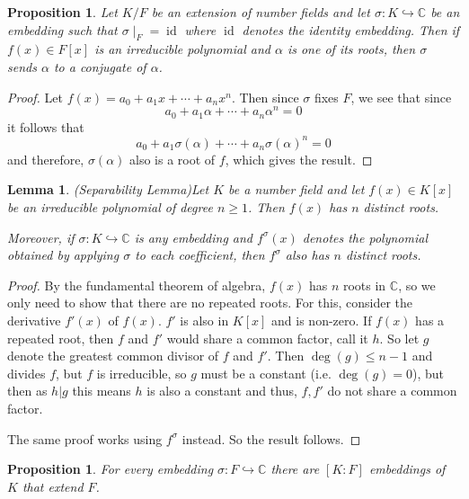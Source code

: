 \documentclass[11pt,a4paper]{report}
\theoremstyle{plain}
\newtheorem{lem}[subsection]{Lemma}
\newtheorem{prop}[subsection]{Proposition}
\theoremstyle{definition}
\theoremstyle{definition}
\def\CC{\mathbb{C}}
\def \a{\alpha}
\def \s {\sigma}
\def \s {\sigma}
\newcommand{\id}{\operatorname{id}}
\begin{document}
	
	\begin{prop}\label{prop: conj roots emb}
		Let $K/F$ be an extension of number fields and let $\sigma: K \hookrightarrow \CC$ be an embedding such that $\sigma\mid_F=\id$ where $\id$ denotes the identity embedding. Then if $f(x) \in F[x]$ is an irreducible polynomial and $\a$ is one of its roots, then $\sigma$ sends $\a$ to a conjugate of $\a$.
	\end{prop}
	
	\begin{proof}
		Let $f(x)= a_0+a_1x+\cdots+a_nx^n$. Then since $\sigma$ fixes $F$, we see that since \[a_0+a_1\a+\cdots+a_n\a^n=0\] it follows that  \[a_0+a_1\sigma(\a)+\cdots+a_n\sigma(\a)^n=0\] and therefore, $\sigma(\a)$ also is a root of $f$, which gives the result.
	\end{proof}
	
	\begin{lem}(Separability Lemma)\label{lem: sep lem} Let $K$ be a number field and let $f(x) \in K[x]$ be an irreducible polynomial of degree $n \geq 1$. Then $f(x)$ has $n$ distinct roots.
		
		Moreover, if $\s:K \hookrightarrow \CC$ is any embedding and $f^\s(x)$ denotes the polynomial obtained by applying $\s$ to each coefficient, then $f^\s$ also has $n$ distinct roots.
		
		
		
	\end{lem}
	\begin{proof}
		By the fundamental theorem of algebra, $f(x)$ has $n$ roots in $\CC$, so we only need to show that there are no repeated roots. For this, consider the derivative $f'(x)$ of $f(x)$. $f'$ is also in $K[x]$ and is non-zero. If $f(x)$ has a repeated root, then $f$ and $f'$ would share a common factor, call it $h$. So let $g$ denote the greatest common divisor of $f$ and $f'$. Then $\deg(g) \leq n-1$ and divides $f$, but $f$ is irreducible, so $g$ must be a constant (i.e. $\deg(g)=0$), but then as $h|g$ this means $h$ is also a constant and thus, $f,f'$ do not share a common factor.
		
		The same proof works using $f^\s$ instead. So the result follows.
	\end{proof}
	
	\begin{prop}\label{prop: emb extns}
		For every embedding $\s: F \hookrightarrow \CC$ there are $[K:F]$ embeddings of $K$ that extend $F$.
	\end{prop}
	
\end{document}
